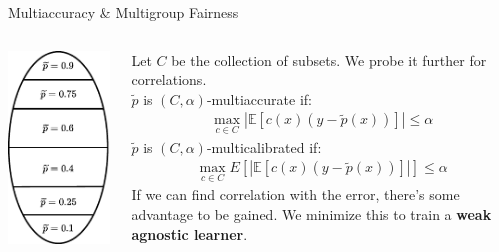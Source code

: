 \documentclass{beamer}
\begin{document}
\begin{frame}{Multiaccuracy \& Multigroup Fairness}
	\begin{columns}
		\begin{column}{0.3\textwidth}
			\begin{center}
				\includegraphics[width=.8\textwidth]{img/partitions}
			\end{center}
		\end{column} \pause
		\begin{column}{0.7\textwidth}
			Let $C$ be the collection of subsets. We probe it further for correlations. \pause \newline \\

			$\tilde{p}$ is $(C, \alpha)$-multiaccurate if:
			\begin{gather}
				\max_{c \in C} |\mathbb{E}[c(x)(y-\tilde{p}(x))]| \leq \alpha
			\end{gather} \pause
			$\tilde{p}$ is $(C, \alpha)$-multicalibrated if:
			\begin{gather}
				\max_{c \in C} E[|\mathbb{E}[c(x)(y-\tilde{p}(x))]|] \leq \alpha
			\end{gather} \pause
			If we can find correlation with the error, there's some advantage to be gained. We minimize this to train a \textbf{weak agnostic learner}.
		\end{column}
	\end{columns}
\end{frame}
\end{document}

